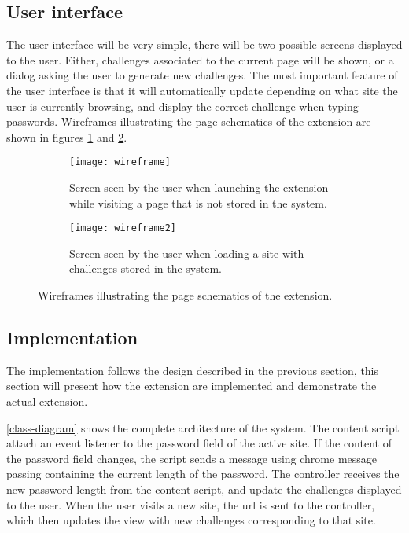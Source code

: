 \subsection{User interface}
The user interface will be very simple, there will be two possible screens displayed to the user. Either, challenges associated to the current page will be shown, or a dialog asking the user to generate new challenges. The most important feature of the user interface is that it will automatically update depending on what site the user is currently browsing, and display the correct challenge when typing passwords. Wireframes illustrating the page schematics of the extension are shown in figures \ref{add-new-screen} and \ref{challenge-screen}.

\begin{figure}[h]
    \centering
    \begin{subfigure}[t]{0.49\textwidth}
        \centering
        \texttt{[image: wireframe]} 
        \caption{Screen seen by the user when launching the extension while visiting a page that is not stored in the system.}
        \label{add-new-screen}
    \end{subfigure}
    \hfill
    \begin{subfigure}[t]{0.49\textwidth}
        \centering
        \texttt{[image: wireframe2]} 
        \caption{Screen seen by the user when loading a site with challenges stored in the system. }
        \label{challenge-screen}
    \end{subfigure}
    \caption{Wireframes illustrating the page schematics of the extension.}
    \label{wireframes}
\end{figure}

\subsection{Implementation}
The implementation follows the design described in the previous section, this section will present how the extension are implemented and demonstrate the actual extension. 


\par \autoref{class-diagram} shows the complete architecture of the system.
 The content script attach an event listener to the password field of the active site. If the content of the password field changes, the script sends a message using chrome message passing containing the current length of the password. The controller receives the new password length from the content script, and update the challenges displayed to the user. When the user visits a new site, the url is sent to the controller, which then updates the view with new challenges corresponding to that site.

